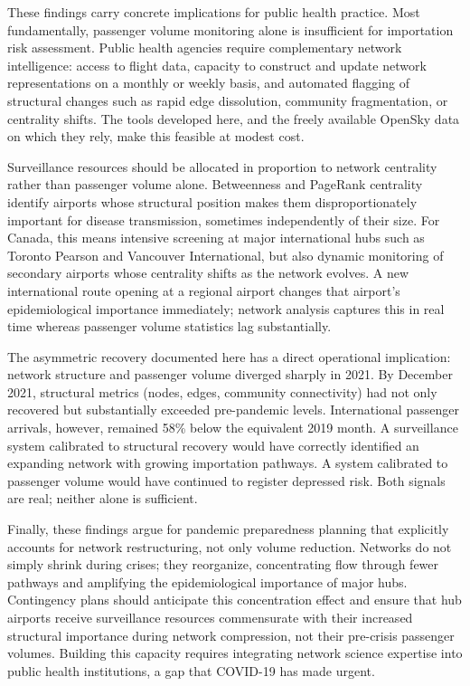 \documentclass{elsarticle}
\begin{document}
These findings carry concrete implications for public health practice. Most fundamentally, passenger volume monitoring alone is insufficient for importation risk assessment. Public health agencies require complementary network intelligence: access to flight data, capacity to construct and update network representations on a monthly or weekly basis, and automated flagging of structural changes such as rapid edge dissolution, community fragmentation, or centrality shifts. The tools developed here, and the freely available OpenSky data on which they rely, make this feasible at modest cost.

Surveillance resources should be allocated in proportion to network centrality rather than passenger volume alone. Betweenness and PageRank centrality identify airports whose structural position makes them disproportionately important for disease transmission, sometimes independently of their size. For Canada, this means intensive screening at major international hubs such as Toronto Pearson and Vancouver International, but also dynamic monitoring of secondary airports whose centrality shifts as the network evolves. A new international route opening at a regional airport changes that airport's epidemiological importance immediately; network analysis captures this in real time whereas passenger volume statistics lag substantially.

The asymmetric recovery documented here has a direct operational implication: network structure and passenger volume diverged sharply in 2021. By December 2021, structural metrics (nodes, edges, community connectivity) had not only recovered but substantially exceeded pre-pandemic levels. International passenger arrivals, however, remained 58\% below the equivalent 2019 month. A surveillance system calibrated to structural recovery would have correctly identified an expanding network with growing importation pathways. A system calibrated to passenger volume would have continued to register depressed risk. Both signals are real; neither alone is sufficient.

Finally, these findings argue for pandemic preparedness planning that explicitly accounts for network restructuring, not only volume reduction. Networks do not simply shrink during crises; they reorganize, concentrating flow through fewer pathways and amplifying the epidemiological importance of major hubs. Contingency plans should anticipate this concentration effect and ensure that hub airports receive surveillance resources commensurate with their increased structural importance during network compression, not their pre-crisis passenger volumes. Building this capacity requires integrating network science expertise into public health institutions, a gap that COVID-19 has made urgent.
\end{document}
